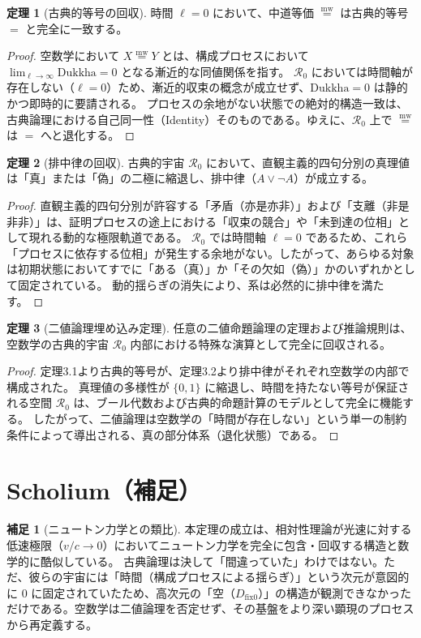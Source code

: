 \documentclass[11pt,a4paper]{article}
\newcommand{\mweq}{\mathrel{\overset{\mathrm{mw}}{=}}}
\newcommand{\dfix}{D_{\mathrm{fix}0}}
\newcommand{\Dukkha}{\mathrm{Dukkha}}
\newcommand{\Rep}{\mathcal{R}}
\theoremstyle{definition}
\newtheorem{theorem}{定理}[section]
\newtheorem{scholium}{補足}[section]
\begin{document}
\begin{theorem}[古典的等号の回収]
時間 $\ell=0$ において、中道等価 $\mweq$ は古典的等号 $=$ と完全に一致する。
\end{theorem}

\begin{proof}
空数学において $X \mweq Y$ とは、構成プロセスにおいて $\lim_{\ell \to \infty} \Dukkha = 0$ となる漸近的な同値関係を指す。
$\Rep_0$ においては時間軸が存在しない（$\ell = 0$）ため、漸近的収束の概念が成立せず、$\Dukkha = 0$ は静的かつ即時的に要請される。
プロセスの余地がない状態での絶対的構造一致は、古典論理における自己同一性（Identity）そのものである。ゆえに、$\Rep_0$ 上で $\mweq$ は $=$ へと退化する。
\end{proof}

\begin{theorem}[排中律の回収]
古典的宇宙 $\Rep_0$ において、直観主義的四句分別の真理値は「真」または「偽」の二極に縮退し、排中律（$A \lor \neg A$）が成立する。
\end{theorem}

\begin{proof}
直観主義的四句分別が許容する「矛盾（亦是亦非）」および「支離（非是非非）」は、証明プロセスの途上における「収束の競合」や「未到達の位相」として現れる動的な極限軌道である。
$\Rep_0$ では時間軸 $\ell = 0$ であるため、これら「プロセスに依存する位相」が発生する余地がない。したがって、あらゆる対象は初期状態においてすでに「ある（真）」か「その欠如（偽）」かのいずれかとして固定されている。
動的揺らぎの消失により、系は必然的に排中律を満たす。
\end{proof}

\begin{theorem}[二値論理埋め込み定理]
任意の二値命題論理の定理および推論規則は、空数学の古典的宇宙 $\Rep_0$ 内部における特殊な演算として完全に回収される。
\end{theorem}

\begin{proof}
定理3.1より古典的等号が、定理3.2より排中律がそれぞれ空数学の内部で構成された。
真理値の多様性が $\{0, 1\}$ に縮退し、時間を持たない等号が保証される空間 $\Rep_0$ は、ブール代数および古典的命題計算のモデルとして完全に機能する。
したがって、二値論理は空数学の「時間が存在しない」という単一の制約条件によって導出される、真の部分体系（退化状態）である。
\end{proof}

\section{Scholium（補足）}

\begin{scholium}[ニュートン力学との類比]
本定理の成立は、相対性理論が光速に対する低速極限（$v/c \to 0$）においてニュートン力学を完全に包含・回収する構造と数学的に酷似している。
古典論理は決して「間違っていた」わけではない。ただ、彼らの宇宙には「時間（構成プロセスによる揺らぎ）」という次元が意図的に $0$ に固定されていたため、高次元の「空（$\dfix$）」の構造が観測できなかっただけである。空数学は二値論理を否定せず、その基盤をより深い顕現のプロセスから再定義する。
\end{scholium}
\end{document}
